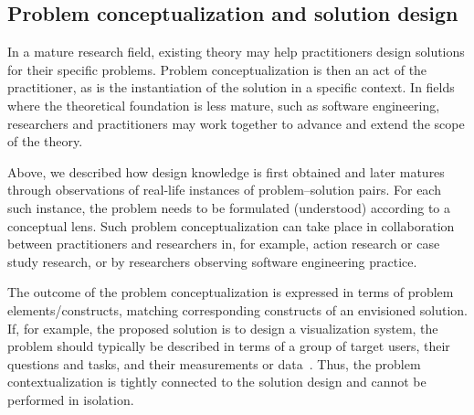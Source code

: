 \documentclass[graybox]{svmult}
\newcommand{\peggy}[1]{\textcolor{blue}{{\it [Peggy says: #1]}}}
\newcommand{\per}[1]{\textcolor{cyan}{{\it [Per says: #1]}}}
\newcommand{\peggy}[1]{}
\newcommand{\per}[1]{}
\begin{document}
\subsection{Problem conceptualization and solution design}


In a mature research field, existing theory may help practitioners design solutions for their specific problems. Problem conceptualization is then an act of the practitioner, as is the instantiation of the solution in a specific context. In fields where the theoretical foundation is less mature, such as software engineering, researchers and practitioners may work together to advance and extend the scope of the theory. 

 Above, we described how design knowledge is first obtained and later matures through observations of real-life instances of problem--solution pairs. For each such instance, the problem needs to be formulated (understood) according to a conceptual lens. Such problem conceptualization can take place in collaboration between practitioners and researchers in, for example, action research or case study research, or by researchers observing software engineering practice.


The outcome of the problem conceptualization is expressed in terms of problem elements/constructs, matching corresponding constructs of an envisioned solution. If, for example, the proposed solution is to design a visualization system, the problem should typically be described in terms of a group of target users, their questions and tasks, and their measurements or data~\cite{meyer_nested_2015}. Thus, the problem contextualization is tightly connected to the solution design and cannot be performed in isolation. 
\end{document}
